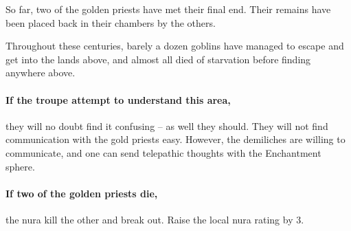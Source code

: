 \begin{multicols}{2}
\begin{exampletext}
  So far, two of the golden priests have met their final end.
  Their remains have been placed back in their chambers by the others.

  Throughout these centuries, barely a dozen goblins have managed to escape and get into the lands above, and almost all died of starvation before finding anywhere above.

\end{exampletext}

\paragraph{If the troupe attempt to understand this area,}
they will no doubt find it confusing -- as well they should.
They will not find communication with the gold priests easy.
However, the demiliches are willing to communicate, and one can send telepathic thoughts with the Enchantment sphere.

\paragraph{If two of the golden priests die,}
the nura kill the other and break out.
Raise the local nura rating by 3.

\end{multicols}
